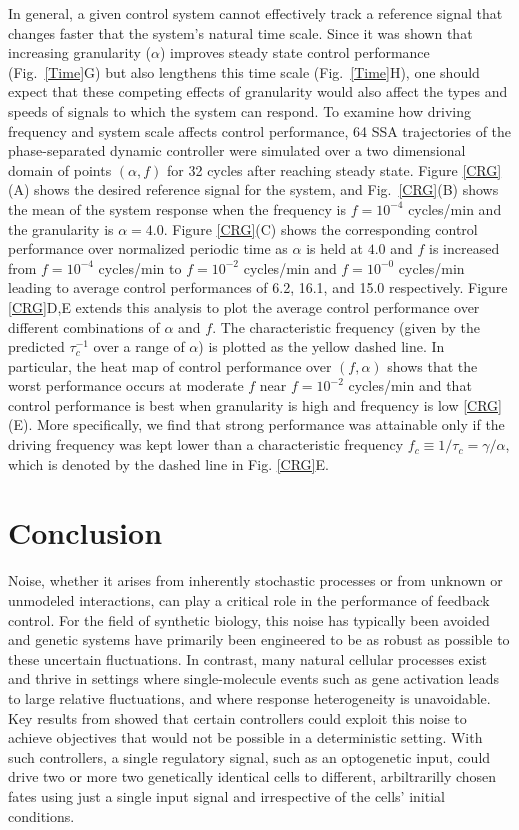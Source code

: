 \documentclass[12pt]{iopart}
\begin{document}
In general, a given control system cannot effectively track a reference signal that changes faster that the system's natural time scale. Since it was shown that increasing granularity ($\alpha$) improves steady state control performance (Fig.\ \ref{Time}G) but also lengthens this time scale (Fig.\ \ref{Time}H), one should expect that these competing effects of granularity would also affect the types and speeds of signals to which the system can respond.
To examine how driving frequency and system scale affects control performance, 64 SSA trajectories of the phase-separated dynamic controller were simulated over a two dimensional domain of points $(\alpha,f)$ for 32 cycles after reaching steady state. 
Figure \ref{CRG}(A) shows the desired reference signal for the system, and Fig.\ \ref{CRG}(B) shows the mean of the system response when the frequency is $f=10^{-4}$ cycles/min and the granularity is $\alpha = 4.0$.  
Figure \ref{CRG}(C) shows the corresponding control performance over normalized periodic time as $\alpha$ is held at $4.0$ and $f$ is increased from $f=10^{-4}$ cycles/min to $f=10^{-2}$ cycles/min and $f=10^{-0}$ cycles/min leading to average control performances of 6.2, 16.1, and 15.0 respectively. 
Figure \ref{CRG}D,E extends this analysis to plot the average control performance over different combinations of $\alpha$ and $f$. 
The characteristic frequency (given by the predicted $\tau_c^{-1}$ over a range of $\alpha$) is plotted as the yellow dashed line.
In particular, the heat map of control performance over $(f,\alpha)$ shows that the worst performance occurs at moderate $f$ near $f=10^{-2}$ cycles/min and that control performance is best when granularity is high and frequency is low \ref{CRG}(E).  More specifically, we find that strong performance was attainable only if the driving frequency was kept lower than a characteristic frequency $f_c \equiv 1 / \tau_c = \gamma/\alpha$, which is denoted by the dashed line in Fig. \ref{CRG}E.


\section{Conclusion}

Noise, whether it arises from inherently stochastic processes or from unknown or unmodeled interactions, can play a critical role in the performance of feedback control. For the field of synthetic biology, this noise has typically been avoided and genetic systems have primarily been engineered to be as robust as possible to these uncertain fluctuations. In contrast, many natural cellular processes exist and thrive in settings where single-molecule events such as gene activation leads to large relative fluctuations, and where response heterogeneity is unavoidable. Key results from \cite{May2021} showed that certain controllers could exploit this noise to achieve objectives that would not be possible in a deterministic setting. With such controllers, a single regulatory signal, such as an optogenetic input, could drive two or more two genetically identical cells to different, arbiltrarilly chosen fates using just a single input signal and irrespective of the cells' initial conditions. 
\end{document}
